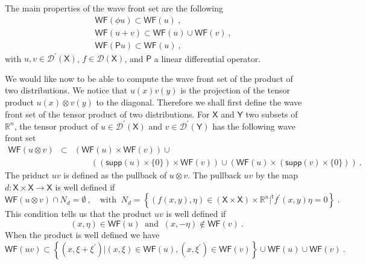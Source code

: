 \documentclass[12pt]{book}
\newcommand{\supp}{\mathsf{supp}}
\newcommand{\WF}{\mathsf{WF}}
\newcommand{\Dcal}{\mathcal{D}}
\newcommand{\Rbb}{\mathbb{R}}
\newcommand{\Psf}{\mathsf{P}}
\newcommand{\Xsf}{\mathsf{X}}
\newcommand{\Ysf}{\mathsf{Y}}
\newcommand{\tsf}{\mathsf{t}}
\theoremstyle{break}
\begin{document}

The main properties of the wave front set are the following \cite{hormander_analysis_1990}
%
\begin{eqnarray}
&& \WF(\phi u) \subset \WF(u) \ , \nonumber \\
&& \WF(u+v) \subset \WF(u) \cup \WF(v) \ , \\ 
&& \WF(\Psf u) \subset \WF(u) \ , \nonumber
\label{eq:prop_wf}
\end{eqnarray}
%
with $u,v \in \Dcal^\prime(\Xsf)$, $f\in\Dcal(\Xsf)$, and $\Psf$ a linear differential operator. 




We would like now to be able to compute the wave front set of the product of two distributions. We notice that $u(x)v(y)$ is the projection of the tensor product $u(x) \otimes v(y)$ to the diagonal. Therefore we shall first define the wave front set of the tensor product of two distributions. For $\Xsf$ and $\Ysf$ two subsets of $\Rbb^n$, the tensor product of $u\in\Dcal^\prime(\Xsf)$ and $v\in\Dcal^\prime(\Ysf)$ has the following wave front set
%
\begin{eqnarray*}
\WF(u \otimes v) &\subset& \left( \WF(u) \times \WF(v) \right) \cup \\
&& \qquad \left( \left( \supp(u) \times \{0\} \right) \times \WF(v) \right) \cup \left( \WF(u) \times \left( \supp(v) \times \{0\} \right) \right) \ . 
\end{eqnarray*}
%
The priduct $uv$ is defined as the pullback of $u \otimes v$. The pullback $u v$ by the map $d : \Xsf \times \Xsf \to \Xsf$ is well defined if 
%
\begin{equation*}
\WF(u \otimes v) \cap N_d = \emptyset \ , \quad \mbox{with } \ N_d = \left\{ (f(x,y) , \eta) \in ( \Xsf \times \Xsf )\times \Rbb^n | ^{\tsf}f^\prime(x,y) \eta = 0 \right\} \ .
\end{equation*}
%
This condition tells us that the product $uv$ is well defined if 
%
\begin{equation*}
(x,\eta) \in \WF(u) \ \mbox{ and } \ (x,-\eta) \notin \WF(v) \ . 
\end{equation*}
%
When the product is well defined we have 
%
\begin{equation*}
\WF(u v) \subset \left\{ (x,\xi+\xi^\prime) | (x,\xi) \in \WF(u) , (x,\xi^\prime) \in \WF(v) \right\} \cup \WF(u) \cup \WF(v) \ . 
\end{equation*}


\end{document}
